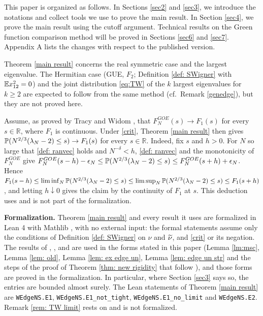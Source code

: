 This paper is organized as follows. In Sections \ref{sec2} and \ref{sec3}, we introduce the notations and collect tools we use to prove the main result. In Section \ref{sec4}, we prove the main result using the cutoff argument. Technical results on the Green function comparison method will be proved in Sections \ref{sec6} and \ref{sec7}. Appendix A lists the changes with respect to the published version.

\begin{rem} \label{rem: scope}
Theorem \ref{main result} concerns the real symmetric case and the largest eigenvalue. The Hermitian case (GUE, $F_2$; Definition \ref{def: SWigner} with $\mathbb{E} x_{12}^2=0$) and the joint distribution \eqref{eq:TW} of the $k$ largest eigenvalues for $k\ge2$ are expected to follow from the same method (cf.\ Remark \ref{genedge}), but they are not proved here.
\end{rem}

\begin{rem} \label{rem: TW limit}
Assume, as proved by Tracy and Widom \cite{TR1, TR2}, that $F^{GOE}_N(s)\to F_1(s)$ for every $s\in\mathbb R$, where $F_1$ is continuous. Under \eqref{crit}, Theorem \ref{main result} then gives $\mathbb{P}(N^{2/3}(\lambda_N-2)\le s)\to F_1(s)$ for every $s\in\mathbb R$. Indeed, fix $s$ and $h>0$. For $N$ so large that \eqref{def: ranvec} holds and $N^{-\delta}<h$, \eqref{def: ranvec} and the monotonicity of $F^{GOE}_N$ give $F^{GOE}_N(s-h)-\epsilon_N\le\mathbb{P}(N^{2/3}(\lambda_N-2)\le s)\le F^{GOE}_N(s+h)+\epsilon_N$. Hence $F_1(s-h)\le\liminf_{N}\mathbb{P}(N^{2/3}(\lambda_N-2)\le s)\le\limsup_{N}\mathbb{P}(N^{2/3}(\lambda_N-2)\le s)\le F_1(s+h)$, and letting $h\downarrow0$ gives the claim by the continuity of $F_1$ at $s$. This deduction uses \cite{TR1, TR2} and is not part of the formalization.
\end{rem}

\medskip
\noindent\textbf{Formalization.} Theorem \ref{main result} and every result it uses are formalized in Lean 4 with Mathlib \cite{Lean}, with no external input: the formal statements assume only the conditions of Definition \ref{def: SWigner} on $\nu$ and $\widetilde\nu$, and \eqref{crit} or its negation. The results of \cite{EKYY1}, \cite{EKYY2}, \cite{EYY} and \cite[Lemma 4.2]{EYY2} are used in the forms stated in this paper (Lemma \ref{lm:msc}, Lemma \ref{lem: old}, Lemma \ref{lem: ex edge un}, Lemma \ref{lem: edge un str} and the steps of the proof of Theorem \ref{thm: new rigidity} that follow \cite[Section 5]{EYY}), and those forms are proved in the formalization. In particular, where Section \ref{sec3} says so, the entries are bounded almost surely. The Lean statements of Theorem \ref{main result} are \texttt{WEdgeNS.E1}, \texttt{WEdgeNS.E1\_not\_tight}, \texttt{WEdgeNS.E1\_no\_limit} and \texttt{WEdgeNS.E2}. Remark \ref{rem: TW limit} rests on \cite{TR1, TR2} and is not formalized.



